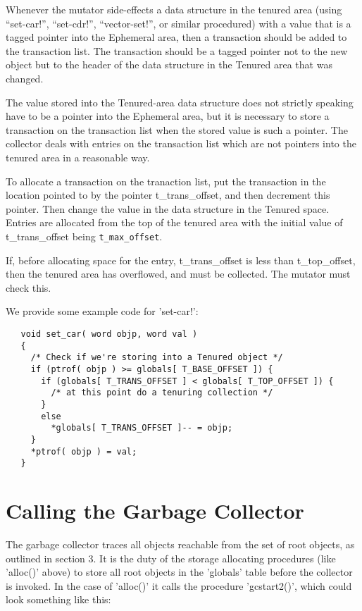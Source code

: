 Whenever the mutator side-effects a data structure in the tenured area
(using ``set-car!'', ``set-cdr!'', ``vector-set!'', or similar procedured)
with a value that is a tagged pointer into the Ephemeral area, then a
transaction should be added to the transaction list. The transaction should
be a tagged pointer not to the new object but to the header of the data
structure in the Tenured area that was changed.

The value stored into the Tenured-area data structure does not strictly
speaking have to be a pointer into the Ephemeral area, but it is necessary
to store a transaction on the transaction list when the stored value is
such a pointer.  The collector deals with entries on the transaction list
which are not pointers into the tenured area in a reasonable way.

To allocate a transaction on the tranaction list, put the transaction in the
location pointed to by the pointer {\sc t\_trans\_offset}, and then
decrement this pointer. Then change the value in the data structure in the
Tenured space.  Entries are allocated from the top of the tenured area with
the initial value of {\sc t\_trans\_offset} being {\tt t\_max\_offset}.

If, before allocating space for the entry, {\sc t\_trans\_offset} is
less than {\sc t\_top\_offset}, then the tenured area has overflowed,
and must be collected. The mutator must check this.

We provide some example code for 'set-car!':

\begin{minipage}{\linewidth}
\begin{verbatim}
   void set_car( word objp, word val )
   {
     /* Check if we're storing into a Tenured object */
     if (ptrof( objp ) >= globals[ T_BASE_OFFSET ]) {
       if (globals[ T_TRANS_OFFSET ] < globals[ T_TOP_OFFSET ]) {
         /* at this point do a tenuring collection */
       }
       else
         *globals[ T_TRANS_OFFSET ]-- = objp;
     }
     *ptrof( objp ) = val;
   }
\end{verbatim}
\end{minipage}


\section{Calling the Garbage Collector}

The garbage collector traces all objects reachable from the set of root
objects, as outlined in section 3.  It is the duty of the storage allocating
procedures (like 'alloc()' above) to store all root objects in the 'globals'
table before the collector is invoked. In the case of 'alloc()' it calls the
procedure 'gcstart2()', which could look something like this:

